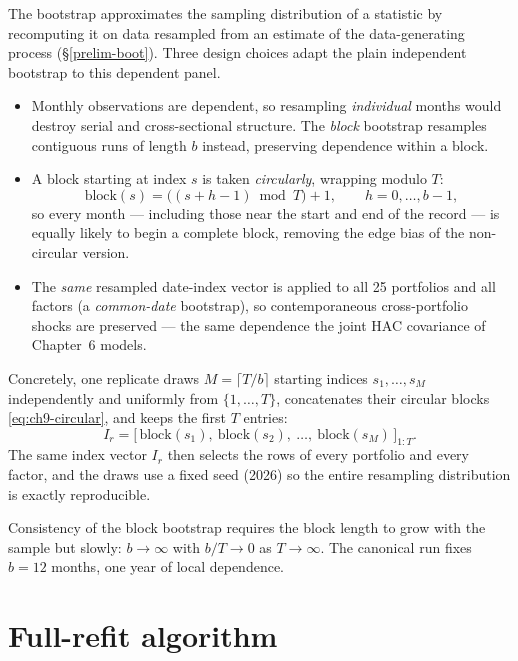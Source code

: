 The bootstrap approximates the sampling distribution of a statistic by
recomputing it on data resampled from an estimate of the data-generating
process (\S\ref{prelim-boot}). Three design choices adapt the plain
independent bootstrap to this dependent panel.
\begin{itemize}
\tightlist
\item
  Monthly observations are dependent, so resampling \emph{individual}
  months would destroy serial and cross-sectional structure. The
  \emph{block} bootstrap resamples contiguous runs of length $b$ instead,
  preserving dependence within a block.
\item
  A block starting at index $s$ is taken \emph{circularly}, wrapping modulo
  $T$:
  \begin{equation}\label{eq:ch9-circular}
  \mathrm{block}(s) = \bigl((s+h-1)\bmod T\bigr)+1,\qquad h=0,\dots,b-1,
  \end{equation}
  so every month --- including those near the start and end of the record ---
  is equally likely to begin a complete block, removing the edge bias of the
  non-circular version.
\item
  The \emph{same} resampled date-index vector is applied to all 25
  portfolios and all factors (a \emph{common-date} bootstrap), so
  contemporaneous cross-portfolio shocks are preserved --- the same
  dependence the joint HAC covariance of Chapter~6 models.
\end{itemize}
Concretely, one replicate draws $M=\lceil T/b\rceil$ starting indices
$s_1,\dots,s_M$ independently and uniformly from $\{1,\dots,T\}$,
concatenates their circular blocks \eqref{eq:ch9-circular}, and keeps the
first $T$ entries:
\begin{equation}\label{eq:ch9-indexvec}
I_r = \bigl[\,\mathrm{block}(s_1),\ \mathrm{block}(s_2),\ \dots,\ \mathrm{block}(s_M)\,\bigr]_{1:T}.
\end{equation}
The same index vector $I_r$ then selects the rows of every portfolio and
every factor, and the draws use a fixed seed (2026) so the entire
resampling distribution is exactly reproducible.

Consistency of the block bootstrap requires the block length to grow with
the sample but slowly: $b\to\infty$ with $b/T\to0$ as $T\to\infty$. The
canonical run fixes $b=12$ months, one year of local dependence.

\hypertarget{full-refit-algorithm}{%
\section{Full-refit algorithm}\label{full-refit-algorithm}}

